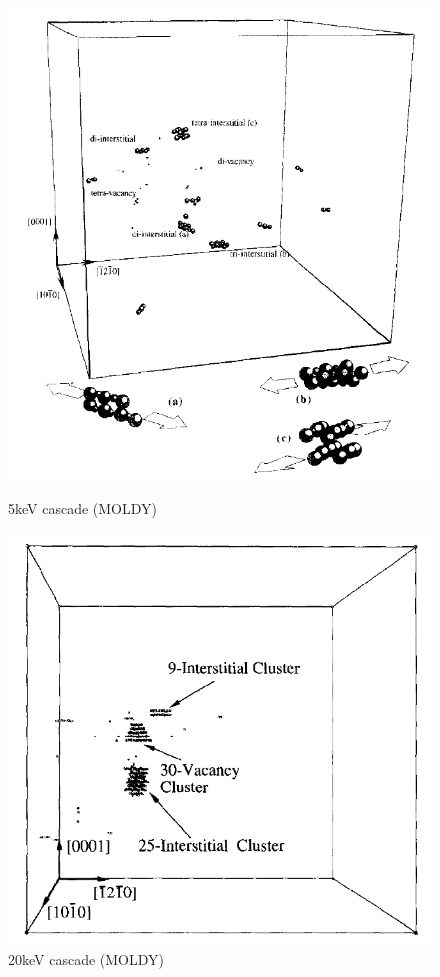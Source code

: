 \FloatBarrier
\begin{figure}[!htb]
\includegraphics[width=\linewidth]{chapters/background_potential_fitting/images/moldy1.png}
\caption{5keV cascade (MOLDY)\cite{pkamoldy}}
\label{fig:moldy5kev}
\endminipage\hfill
{}
\includegraphics[width=\linewidth]{chapters/background_potential_fitting/images/moldy2.png}
\caption{20keV cascade (MOLDY)\cite{pkamoldy}}
\label{fig:moldy20kev}
\endminipage
\end{figure}
\FloatBarrier


